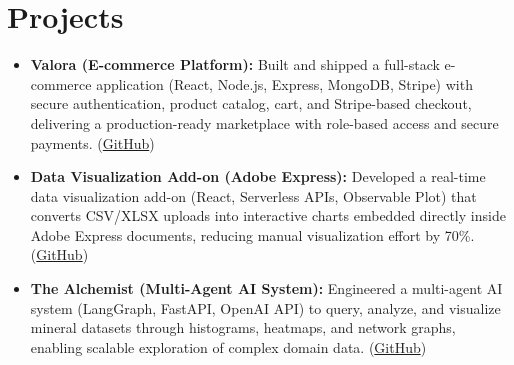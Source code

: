 
\vspace{-10pt}

\section*{Projects}
\begin{itemize}[leftmargin=*, itemsep=1pt]

\item \textbf{Valora (E-commerce Platform):}
Built and shipped a full-stack e-commerce application (React, Node.js, Express, MongoDB, Stripe) with secure authentication, product catalog, cart, and Stripe-based checkout, delivering a production-ready marketplace with role-based access and secure payments.
(\href{https://github.com/prateekrauniyar345/Valora}{GitHub})


\item \textbf{Data Visualization Add-on (Adobe Express):}
Developed a real-time data visualization add-on (React, Serverless APIs, Observable Plot) that converts CSV/XLSX uploads into interactive charts embedded directly inside Adobe Express documents, reducing manual visualization effort by 70\%.
(\href{https://github.com/prateekrauniyar345/adobe-first-add-on}{GitHub})

\item \textbf{The Alchemist (Multi-Agent AI System):}
Engineered a multi-agent AI system (LangGraph, FastAPI, OpenAI API) to query, analyze, and visualize mineral datasets through histograms, heatmaps, and network graphs, enabling scalable exploration of complex domain data.
(\href{https://github.com/prateekrauniyar345/Senior-Design-The-Alchemist}{GitHub})

\end{itemize}
